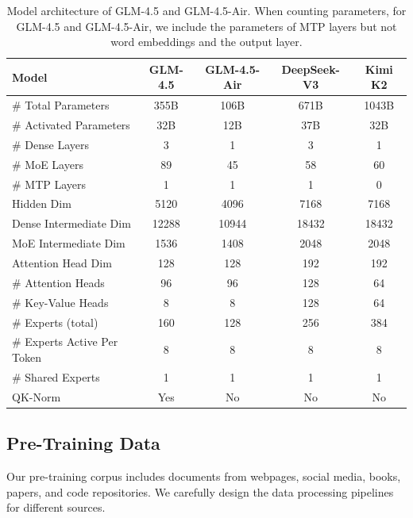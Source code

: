 \begin{table}[!h]
    \centering
    \caption{Model architecture of GLM-4.5 and GLM-4.5-Air. When counting parameters, for GLM-4.5 and GLM-4.5-Air, we include the parameters of MTP layers but not word embeddings and the output layer.}
    
    \label{tab:placeholder}
    \begin{tabular}{l|cc|cc}
    \toprule
       Model & \textbf{GLM-4.5} & \textbf{GLM-4.5-Air} & \textbf{DeepSeek-V3} & \textbf{Kimi K2} \\
    \midrule
       \# Total Parameters & 355B & 106B & 671B & 1043B \\
       \# Activated Parameters & 32B & 12B & 37B & 32B \\
       \# Dense Layers  & 3 & 1 & 3 & 1 \\
       \# MoE Layers & 89 & 45 & 58 & 60 \\
       \# MTP Layers & 1 & 1 & 1 & 0 \\
       Hidden Dim & 5120 & 4096 & 7168 & 7168 \\
       Dense Intermediate Dim & 12288 & 10944 & 18432 & 18432 \\
       MoE Intermediate Dim & 1536 & 1408 & 2048 & 2048 \\
       Attention Head Dim & 128 & 128 & 192 & 192\\
       \# Attention Heads & 96 & 96 & 128 & 64 \\
       \# Key-Value Heads & 8 & 8 & 128 & 64 \\
       \# Experts (total) & 160 & 128 & 256 & 384 \\
       \# Experts Active Per Token & 8 & 8 & 8 & 8\\
       \# Shared Experts & 1 & 1 & 1 & 1\\
       QK-Norm & Yes & No & No & No \\
    \bottomrule
    \end{tabular}
\end{table}


\subsection{Pre-Training Data}
Our pre-training corpus includes documents from webpages, social media, books, papers, and code repositories. We carefully design the data processing pipelines for different sources. 

